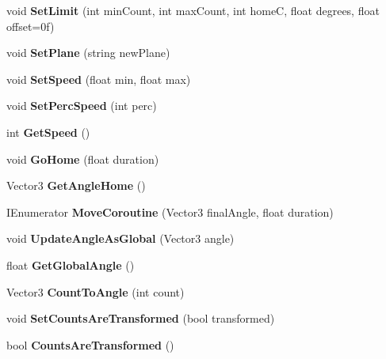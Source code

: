 \begin{DoxyCompactItemize}
void {\bfseries Set\+Limit} (int min\+Count, int max\+Count, int homeC, float degrees, float offset=0f)
\item 
\mbox{\label{class_articulation_abc1e52ec4c3370c2b8dd20b257c437ac}} 
void {\bfseries Set\+Plane} (string new\+Plane)
\item 
\mbox{\label{class_articulation_a6522fc73e75eb5953305d51fcae10466}} 
void {\bfseries Set\+Speed} (float min, float max)
\item 
\mbox{\label{class_articulation_a1674f771decad9bc252aa45edb116bb2}} 
void {\bfseries Set\+Perc\+Speed} (int perc)
\item 
\mbox{\label{class_articulation_af125f382466f26db3296f90fb896fd5a}} 
int {\bfseries Get\+Speed} ()
\item 
\mbox{\label{class_articulation_abe8a64163ae7fda2bcae5035ad1bfb75}} 
void {\bfseries Go\+Home} (float duration)
\item 
\mbox{\label{class_articulation_ac933fade16023f1adb224eed98427cb9}} 
Vector3 {\bfseries Get\+Angle\+Home} ()
\item 
\mbox{\label{class_articulation_a161b3c95046618f615f0b5d6867ef658}} 
I\+Enumerator {\bfseries Move\+Coroutine} (Vector3 final\+Angle, float duration)
\item 
\mbox{\label{class_articulation_a94f0c8fac481b23ec71ac8c4cd8b0862}} 
void {\bfseries Update\+Angle\+As\+Global} (Vector3 angle)
\item 
\mbox{\label{class_articulation_ac60e77664f8666756cde14a3947a8306}} 
float {\bfseries Get\+Global\+Angle} ()
\item 
\mbox{\label{class_articulation_a8b735ad392d0329c76f91e95768c026d}} 
Vector3 {\bfseries Count\+To\+Angle} (int count)
\item 
\mbox{\label{class_articulation_ae1b9d736b24392a46c7d53e91cbe7908}} 
void {\bfseries Set\+Counts\+Are\+Transformed} (bool transformed)
\item 
\mbox{\label{class_articulation_aad8aba05576db394129968fe191ccc7c}} 
bool {\bfseries Counts\+Are\+Transformed} ()
\end{DoxyCompactItemize}
